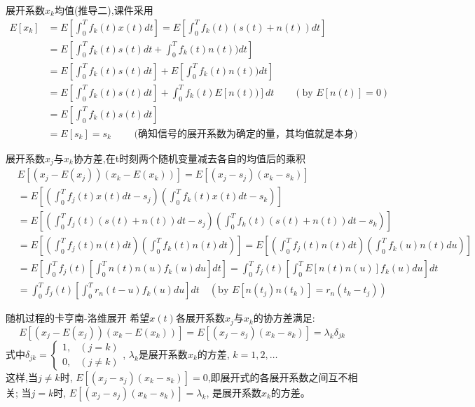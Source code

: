 \begin{frame}{展开系数$x_k$均值(推导二),课件采用}
\begin{align*}
E[x_k]&=E\left[\int_{0}^{T}f_k(t)x(t)dt\right]=E\left[\int_{0}^{T}f_k(t)(s(t)+n(t))dt\right]\\
&=E\left[\int_{0}^{T}f_k(t)s(t)dt+\int_{0}^{T}f_k(t)n(t))dt\right]\\
&=E\left[\int_{0}^{T}f_k(t)s(t)dt\right]+E\left[\int_{0}^{T}f_k(t)n(t))dt\right]\\
&=E\left[\int_{0}^{T}f_k(t)s(t)dt\right]+\int_{0}^{T}f_k(t)E[n(t))]dt \qquad  (\text{by }E[n(t)]=0)\\
&=E\left[\int_{0}^{T}f_k(t)s(t)dt\right]\\
&= E[s_k] = s_k\qquad \text{  (确知信号的展开系数为确定的量，其均值就是本身)}
\end{align*}
\end{frame}

\begin{frame}{展开系数$x_j$与$x_k$协方差,在t时刻两个随机变量减去各自的均值后的乘积}
\begin{align*}
&E[(x_j-E(x_j))(x_k-E(x_k))]=E[(x_j-s_j)(x_k-s_k)]\\
&=E\left[\left(\int_{0}^{T}f_j(t)x(t)dt-s_j\right)\left(\int_{0}^{T}f_k(t)x(t)dt-s_k\right)\right]\\
&=E\left[\left(\int_{0}^{T}f_j(t)(s(t)+n(t))dt-s_j\right)\left(\int_{0}^{T}f_k(t)(s(t)+n(t))dt-s_k\right)\right]\\
&=E\left[\left(\int_{0}^{T}f_j(t)n(t)dt\right)\left(\int_{0}^{T}f_k(t)n(t)dt\right)\right]=E\left[\left(\int_{0}^{T}f_j(t)n(t)dt\right)\left(\int_{0}^{T}f_k(u)n(t)du\right)\right]\\
&=E\left[\int_{0}^{T}f_j(t)\left[\int_{0}^{T}n(t)n(u)f_k(u)du\right]dt\right]=\int_{0}^{T}f_j(t)\left[\int_{0}^{T}E[n(t)n(u)]f_k(u)du\right]dt\\
&=\int_{0}^{T}f_j(t)\left[\int_{0}^{T}r_n(t-u)f_k(u)du\right]dt\quad (\text{by }E[n(t_j)n(t_k)]=r_n(t_k-t_j))
\end{align*}
\end{frame}

\begin{frame}{随机过程的卡亨南-洛维展开}
希望$x(t)$各展开系数$x_j$与$x_k$的协方差满足:
\[E[(x_j-E(x_j))(x_k-E(x_k))]=E[(x_j-s_j)(x_k-s_k)]=\lambda_k\delta_{jk} \]
式中$\delta_{jk}=
\begin{cases}
1, & (j=k)\\
0, & (j\ne k)
\end{cases}$, $\lambda_k$是展开系数$x_k$的方差, $k=1,2,\dots$\\
这样,当$j\ne k$时, $E[(x_j-s_j)(x_k-s_k)]=0$,即展开式的各展开系数之间互不相关; 当$j=k$时, $E[(x_j-s_j)(x_k-s_k)]=\lambda_k$, 是展开系数$x_k$的方差。
\end{frame}

